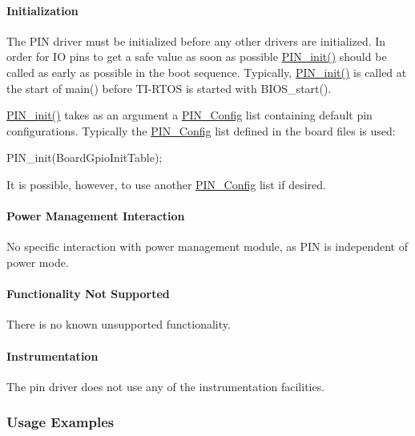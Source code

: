 \paragraph*{Initialization}

The P\+I\+N driver must be initialized before any other drivers are initialized. In order for I\+O pins to get a safe value as soon as possible \hyperlink{_p_i_n_8h_a0de1df98a14e6e13b16db414e54472ef}{P\+I\+N\+\_\+init()} should be called as early as possible in the boot sequence. Typically, \hyperlink{_p_i_n_8h_a0de1df98a14e6e13b16db414e54472ef}{P\+I\+N\+\_\+init()} is called at the start of main() before T\+I-\/\+R\+T\+O\+S is started with B\+I\+O\+S\+\_\+start().

\hyperlink{_p_i_n_8h_a0de1df98a14e6e13b16db414e54472ef}{P\+I\+N\+\_\+init()} takes as an argument a \hyperlink{_p_i_n_8h_ae427b7d2925f9b0f3145e455cfdb5841}{P\+I\+N\+\_\+\+Config} list containing default pin configurations. Typically the \hyperlink{_p_i_n_8h_ae427b7d2925f9b0f3145e455cfdb5841}{P\+I\+N\+\_\+\+Config} list defined in the board files is used\+: 
\begin{DoxyCode}
PIN_init(BoardGpioInitTable);
\end{DoxyCode}
 It is possible, however, to use another \hyperlink{_p_i_n_8h_ae427b7d2925f9b0f3145e455cfdb5841}{P\+I\+N\+\_\+\+Config} list if desired.

\paragraph*{Power Management Interaction}

No specific interaction with power management module, as P\+I\+N is independent of power mode.

\paragraph*{Functionality Not Supported}

There is no known unsupported functionality.

\paragraph*{Instrumentation}

The pin driver does not use any of the instrumentation facilities.

\subsubsection*{Usage Examples}

